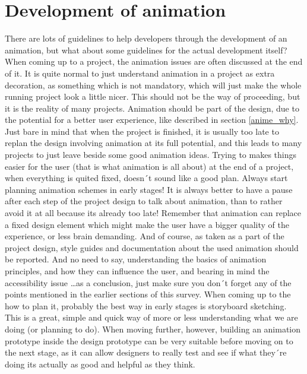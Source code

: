 \section{Development of animation} %
\label{sec:anime_dev}

There are lots of guidelines to help developers through the development of an animation, but what about some guidelines for the actual development itself? When coming up to a project, the animation issues are often discussed at the end of it. It is quite normal to just understand animation in a project as extra decoration, as something which is not mandatory, which will just make the whole running project look a little nicer. This should not be the way of proceeding, but it is the reality of many projects. Animation should be part of the design, due to the potential for a better user experience, like described in section \ref{anime_why}. Just bare in mind that when the project is finished, it is usually too late to replan the design involving animation at its full potential, and this leads to many projects to just leave beside some good animation ideas.
Trying to makes things easier for the user (that is what animation is all about) at the end of a project, when everything is quited fixed, doesn´t sound like a good plan. Always start planning animation schemes in early stages! It is always better to have a pause after each step of the project design to talk about animation, than to rather avoid it at all because its already too late! Remember that animation can replace a fixed design element which might make the user have a bigger quality of the experience, or less brain demanding. And of course, as taken as a part of the project design, style guides and documentation about the used animation should be reported. And no need to say, understanding the basics of animation principles, and how they can influence the user, and bearing in mind the accessibility issue \ldots as a conclusion, just make sure you don´t forget any of the points mentioned in the earlier sections of this survey. When coming up to the how to plan it, probably the best way in early stages is storyboard sketching. This is a great, simple and quick way of more or less understanding what we are doing (or planning to do). When moving further, however, building an animation prototype inside the design prototype can be very suitable before moving on to the next stage, as it can allow designers to really test and see if what they´re doing its actually as good and helpful as they think.


